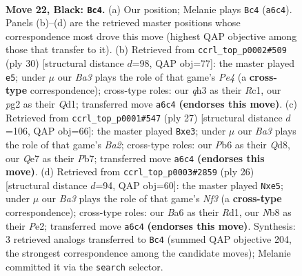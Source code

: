 \documentclass[11pt]{article}
\begin{document}
\clearpage

\begin{figure}[p]\centering
\begin{subfigure}{0.46\textwidth}\centering
\resizebox{\linewidth}{!}{%
\newchessgame
\chessboard[
  setfen={rn2r1k1/2pnq1pp/bp2p3/p2pPp2/3P1P1P/P4NNQ/1PPK2P1/1R3B1R b - - 6 22},
  showmover=false,
  pgfstyle=straightmove, color=movearrow, markmove={a6-c4}
]}
\caption{}
\end{subfigure}\hfill
\begin{subfigure}{0.46\textwidth}\centering
\resizebox{\linewidth}{!}{%
\newchessgame
\chessboard[
  setfen={r2q1r1k/1ppb2pp/1n1npp2/p7/P1pPP2P/5NP1/1P1N1PB1/R1RQ2K1 w - - 1 16},
  showmover=false,
  pgfstyle=straightmove, color=movearrow, markmove={e4-e5}
]}
\caption{}
\end{subfigure}
\\[4pt]
\begin{subfigure}{0.46\textwidth}\centering
\resizebox{\linewidth}{!}{%
\newchessgame
\chessboard[
  setfen={r2qr1k1/bpp2pp1/p1n2n1p/3pp3/PP2P3/2PPNN1P/2Q2PP1/R1B1R1K1 b - - 1 14},
  showmover=false,
  pgfstyle=straightmove, color=movearrow, markmove={a7-e3}
]}
\caption{}
\end{subfigure}\hfill
\begin{subfigure}{0.46\textwidth}\centering
\resizebox{\linewidth}{!}{%
\newchessgame
\chessboard[
  setfen={r2qk2r/pb1p1ppp/1p3n2/nP2p3/2Pp4/5NP1/P1Q1PPBP/RN1R2K1 w kq - 1 14},
  showmover=false,
  pgfstyle=straightmove, color=movearrow, markmove={f3-e5}
]}
\caption{}
\end{subfigure}
\caption{\textbf{Move 22, Black: \texttt{Bc4}.} (a) Our position; Melanie plays \texttt{Bc4} (\texttt{a6c4}). Panels (b)--(d) are the retrieved master positions whose correspondence most drove this move (highest QAP objective among those that transfer to it). (b) Retrieved from \texttt{ccrl\_top\_p0002\#509} (ply 30) [structural distance $d$=98, QAP obj=77]: the master played \texttt{e5}; under $\mu$ our \emph{Ba3} plays the role of that game's \emph{Pe4} (a \textbf{cross-type} correspondence); cross-type roles: our \emph{q}h3 as their \emph{R}c1, our \emph{p}g2 as their \emph{Q}d1; transferred move \texttt{a6c4} \textbf{(endorses this move)}. (c) Retrieved from \texttt{ccrl\_top\_p0001\#547} (ply 27) [structural distance $d$=106, QAP obj=66]: the master played \texttt{Bxe3}; under $\mu$ our \emph{Ba3} plays the role of that game's \emph{Ba2}; cross-type roles: our \emph{P}b6 as their \emph{Q}d8, our \emph{Q}e7 as their \emph{P}b7; transferred move \texttt{a6c4} \textbf{(endorses this move)}. (d) Retrieved from \texttt{ccrl\_top\_p0003\#2859} (ply 26) [structural distance $d$=94, QAP obj=60]: the master played \texttt{Nxe5}; under $\mu$ our \emph{Ba3} plays the role of that game's \emph{Nf3} (a \textbf{cross-type} correspondence); cross-type roles: our \emph{B}a6 as their \emph{R}d1, our \emph{N}b8 as their \emph{P}e2; transferred move \texttt{a6c4} \textbf{(endorses this move)}. Synthesis: 3 retrieved analogs transferred to \texttt{Bc4} (summed QAP objective 204, the strongest correspondence among the candidate moves); Melanie committed it via the \texttt{search} selector.}
\label{fig:thought-m43}
\end{figure}
\end{document}
